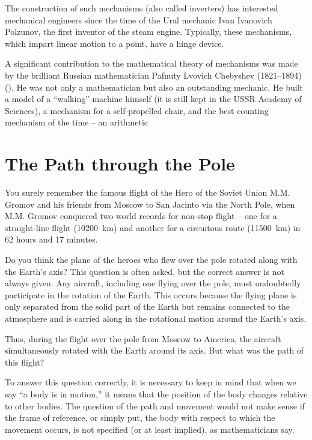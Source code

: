 The construction of such mechanisms (also called inverters) has interested mechanical engineers since the time of the Ural mechanic Ivan Ivanovich Polzunov, the first inventor of the steam engine. Typically, these mechanisms, which impart linear motion to a point, have a hinge device. 


A significant contribution to the mathematical theory of mechanisms was made by the brilliant Russian mathematician Pafnuty Lvovich Chebyshev (1821–1894) (). He was not only a mathematician but also an outstanding mechanic. He built a model of a ``walking'' machine himself (it is still kept in the USSR Academy of Sciences), a mechanism for a self-propelled chair, and the best counting mechanism of the time -- an arithmetic


\section{The Path through the Pole}
\label{sec-9.12}


You surely remember the famous flight of the Hero of the Soviet Union M.M. Gromov and his friends from Moscow to San Jacinto via the North Pole, when M.M. Gromov conquered two world records for non-stop flight -- one for a straight-line flight (\SI{10200}{\kilo\meter}) and another for a circuitous route (\SI{11500}{\kilo\meter}) in 62 hours and 17 minutes.

Do you think the plane of the heroes who flew over the pole rotated along with the Earth's axis? This question is often asked, but the correct answer is not always given. Any aircraft, including one flying over the pole, must undoubtedly participate in the rotation of the Earth. This occurs because the flying plane is only separated from the solid part of the Earth but remains connected to the atmosphere and is carried along in the rotational motion around the Earth's axis.

Thus, during the flight over the pole from Moscow to America, the aircraft simultaneously rotated with the Earth around its axis. But what was the path of this flight?

To answer this question correctly, it is necessary to keep in mind that when we say ``a body is in motion,'' it means that the position of the body changes relative to other bodies. The question of the path and movement would not make sense if the frame of reference, or simply put, the body with respect to which the movement occurs, is not specified (or at least implied), as mathematicians say.

